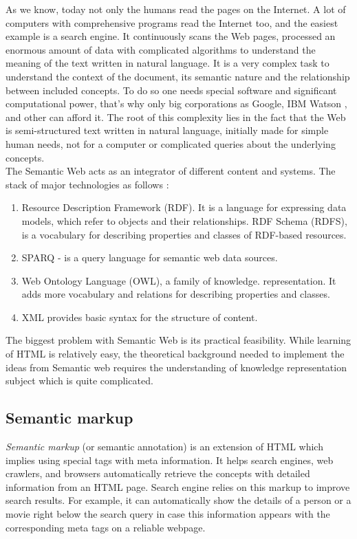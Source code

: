 As we know, today not only the humans read the pages on the Internet. A lot of computers with comprehensive programs read the Internet too, and the easiest example is a search engine. It continuously scans the Web pages, processed an enormous amount of data with complicated algorithms to understand the meaning of the text written in natural language. It is a very complex task to understand the context of the document, its semantic nature and the relationship between included concepts. To do so one needs special software and significant computational power, that's why only big corporations as Google, IBM Watson \cite{IBMAlchemy}, and other can afford it. The root of this complexity lies in the fact that the Web is semi-structured text written in natural language, initially made for simple human needs, not for a computer or complicated queries about the underlying concepts.\\ 

The Semantic Web acts as an integrator of different content and systems. The stack of major technologies as follows \cite{WikiSeman}: 

\begin{enumerate}
    \item Resource Description Framework (RDF). It is a language for expressing data models, which refer to objects and their relationships. 
    \itme RDF Schema (RDFS), is a vocabulary for describing properties and classes of RDF-based resources.
    \item SPARQ - is a query language for semantic web data sources.
    \item Web Ontology Language (OWL), a family of knowledge. representation. It adds more vocabulary and relations for describing properties and classes.
    \item XML provides basic syntax for the structure of content.
\end{enumerate}

The biggest problem with Semantic Web is its practical feasibility. While learning of HTML is relatively easy, the theoretical background needed to implement the ideas from Semantic web requires the understanding of knowledge representation subject which is quite complicated. 

\subsection{Semantic markup}
\textit{Semantic markup} (or semantic annotation) is an extension of HTML which implies using special tags with meta information. It helps search engines, web crawlers, and browsers automatically retrieve the concepts with detailed information from an HTML page. Search engine relies on this markup to improve search results. For example, it can automatically show the details of a person or a movie right below the search query in case this information appears with the corresponding meta tags on a reliable webpage.\\ 

